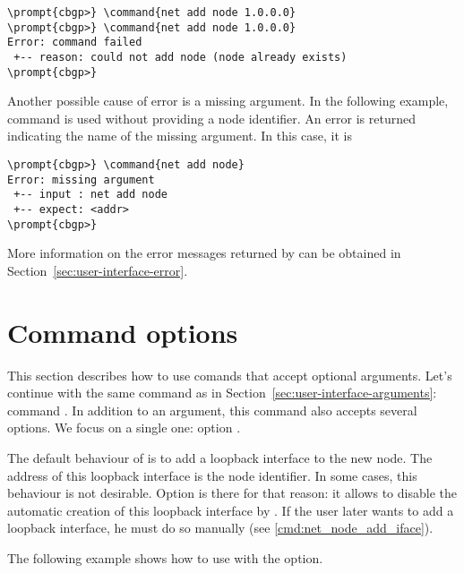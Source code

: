 \begin{Verbatim}[commandchars=\\\{\}]
\prompt{cbgp>} \command{net add node 1.0.0.0}
\prompt{cbgp>} \command{net add node 1.0.0.0}
Error: command failed
 +-- reason: could not add node (node already exists)
\prompt{cbgp>}
\end{Verbatim}

Another possible cause of error is a missing argument. In the
following example, command  is used without
providing a node identifier. An error is returned indicating the name
of the missing argument. In this case, it is 

\begin{Verbatim}[commandchars=\\\{\}]
\prompt{cbgp>} \command{net add node}
Error: missing argument
 +-- input : net add node 
 +-- expect: <addr>
\prompt{cbgp>}
\end{Verbatim}

More information on the error messages returned by 
can be obtained in Section~\ref{sec:user-interface-error}.

\section{Command options}
\label{sec:user-interface-options}

This section describes how to use comands that accept optional
arguments. Let's continue with the same command as in
Section~\ref{sec:user-interface-arguments}: command . In addition to an argument, this command also accepts several
options. We focus on a single one: option .

The default behaviour of  is to add a loopback
interface to the new node. The address of this loopback interface is
the node identifier. In some cases, this behaviour is not
desirable. Option  is there for that reason:
it allows to disable the automatic creation of this loopback interface
by . If the user later wants to add a loopback
interface, he must do so manually (see \ref{cmd:net_node_add_iface}).

The following example shows how to use  with the
 option.

